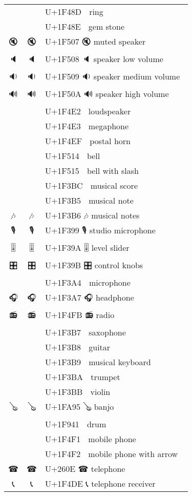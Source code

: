 \documentclass[a4paper,12pt]{article}
\newcommand{\fontA}[1]{{\fontspec[RawFeature={mode=harf,+dist,+ccmp}]{Segoe UI Emoji} #1}}
\newcommand{\fontB}[1]{{\fontspec[RawFeature={mode=harf,+dist,+ccmp}]{Noto Color Emoji} #1}}
\begin{document}
\begin{longtable}[c]{ccp{0.8\linewidth}}
\fontA{💍}&\fontB{💍}&U+1F48D 💍 ring\\
\fontA{💎}&\fontB{💎}&U+1F48E 💎 gem stone\\
\fontA{🔇}&\fontB{🔇}&U+1F507 🔇 muted speaker\\
\fontA{🔈}&\fontB{🔈}&U+1F508 🔈 speaker low volume\\
\fontA{🔉}&\fontB{🔉}&U+1F509 🔉 speaker medium volume\\
\fontA{🔊}&\fontB{🔊}&U+1F50A 🔊 speaker high volume\\
\fontA{📢}&\fontB{📢}&U+1F4E2 📢 loudspeaker\\
\fontA{📣}&\fontB{📣}&U+1F4E3 📣 megaphone\\
\fontA{📯}&\fontB{📯}&U+1F4EF 📯 postal horn\\
\fontA{🔔}&\fontB{🔔}&U+1F514 🔔 bell\\
\fontA{🔕}&\fontB{🔕}&U+1F515 🔕 bell with slash\\
\fontA{🎼}&\fontB{🎼}&U+1F3BC 🎼 musical score\\
\fontA{🎵}&\fontB{🎵}&U+1F3B5 🎵 musical note\\
\fontA{🎶}&\fontB{🎶}&U+1F3B6 🎶 musical notes\\
\fontA{🎙}&\fontB{🎙}&U+1F399 🎙 studio microphone\\
\fontA{🎚}&\fontB{🎚}&U+1F39A 🎚 level slider\\
\fontA{🎛}&\fontB{🎛}&U+1F39B 🎛 control knobs\\
\fontA{🎤}&\fontB{🎤}&U+1F3A4 🎤 microphone\\
\fontA{🎧}&\fontB{🎧}&U+1F3A7 🎧 headphone\\
\fontA{📻}&\fontB{📻}&U+1F4FB 📻 radio\\
\fontA{🎷}&\fontB{🎷}&U+1F3B7 🎷 saxophone\\
\fontA{🎸}&\fontB{🎸}&U+1F3B8 🎸 guitar\\
\fontA{🎹}&\fontB{🎹}&U+1F3B9 🎹 musical keyboard\\
\fontA{🎺}&\fontB{🎺}&U+1F3BA 🎺 trumpet\\
\fontA{🎻}&\fontB{🎻}&U+1F3BB 🎻 violin\\
\fontA{🪕}&\fontB{🪕}&U+1FA95 🪕 banjo\\
\fontA{🥁}&\fontB{🥁}&U+1F941 🥁 drum\\
\fontA{📱}&\fontB{📱}&U+1F4F1 📱 mobile phone\\
\fontA{📲}&\fontB{📲}&U+1F4F2 📲 mobile phone with arrow\\
\fontA{☎}&\fontB{☎}&U+260E ☎ telephone\\
\fontA{📞}&\fontB{📞}&U+1F4DE 📞 telephone receiver\\

\end{longtable}
\end{document}
